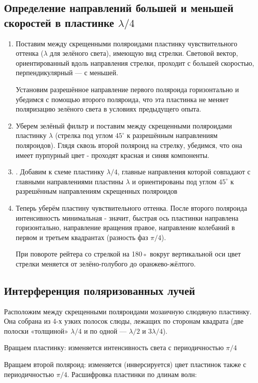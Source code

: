 \subsection{Определение направлений большей и меньшей скоростей в пластинке $\lambda/4$}

\begin{enumerate}
    \item Поставим между скрещенными поляроидами пластинку чувствительного оттенка ($\lambda$ для зелёного света), имеющую вид стрелки. Световой вектор, ориентированный вдоль направления стрелки, проходит с большей скоростью, перпендикулярный — с меньшей. \par
Установим разрешённое направление первого поляроида горизонтально и убедимся с помощью второго поляроида, что эта пластинка
не меняет поляризацию зелёного света в условиях предыдущего опыта.
\begin{figure}[h!]
	  \center{\texttt{[image: 7]}}
\end{figure}
\item Уберем зелёный фильтр
и поставим между скрещенными поляроидами
пластинку $\lambda$ (стрелка под углом $45^{\circ}$ к разрешённым направлениям поляроидов).
Глядя сквозь второй поляроид на стрелку, убедимся, что она имеет пурпурный цвет - проходят красная и синяя компоненты.
\item . Добавим
к схеме пластинку $\lambda/4$, главные направления
которой совпадают с главными направлениями пластины $\lambda$ и ориентированы под
углом $45^{\circ}$ к разрешённым направлениям скрещенных поляроидов

\item Теперь уберём пластину чувствительного оттенка. После второго поляроида интенсивность минимальная - значит, быстрая ось пластинки направлена горизонтально, направление вращения правое, направление колебаний в первом и третьем квадрантах (разность фаз $\pi/4$). \par
При повороте рейтера со стрелкой на 180◦ вокруг вертикальной оси
цвет стрелки меняется от зелёно-голубого до оранжево-жёлтого.

\end{enumerate}


\subsection{Интерференция поляризованных лучей}

Расположим между скрещенными поляроидами мозаичную слюдяную пластинку. Она собрана из 4-х узких полосок слюды, лежащих по сторонам квадрата (две полоски «толщиной» $\lambda/4$ и по одной — $\lambda/2$ и $3\lambda/4$).
\par Вращаем пластинку: изменяется интенсивность света с периодичностью $\pi/4$
\par Вращаем второй поляроид: изменяется (инверсируется) цвет пластинок также с периодичностью  $\pi/4$. Расшифровка пластинки по длинам волн:

